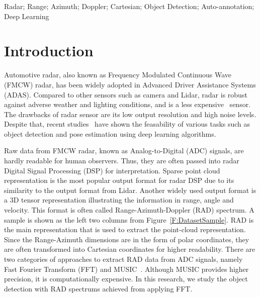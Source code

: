 \documentclass[10pt, conference, compsocconf]{IEEEtran}
\begin{document}
\begin{IEEEkeywords}

Radar; Range; Azimuth; Doppler; Cartesian; Object Detection; Auto-annotation; Deep Learning

\end{IEEEkeywords}


%
\IEEEpeerreviewmaketitle



\section{Introduction}

Automotive radar, also known as Frequency Modulated Continuous Wave (FMCW) radar, has been widely adopted in Advanced Driver Assistance Systems (ADAS). Compared to other sensors such as camera and Lidar, radar is robust against adverse weather and lighting conditions, and is a less expensive~\cite{Ref:HighResolutionRadarDataset} sensor. The drawbacks of radar sensor are its low output resolution and high noise levels. Despite that, recent studies~\cite{Ref:ProbabilisticOriented, Ref:DeepRadarDetector, Ref:DeepOpenSpace} have shown the feasability of various tasks such as object detection and pose estimation using deep learning algorithms.


Raw data from FMCW radar, known as Analog-to-Digital (ADC) signals, are hardly readable for human observers. Thus, they are often passed into radar Digital Signal Processing (DSP) for interpretation. Sparse point cloud representation is the most popular output format for radar DSP due to its similarity to the output format from Lidar. Another widely used output format is a 3D tensor representation illustrating the information in range, angle and velocity. This format is often called Range-Azimuth-Doppler (RAD) spectrum. A sample is shown as the left two columns from Figure~\ref{F:DatasetSample}. RAD is the main representation that is used to extract the point-cloud representation. Since the Range-Azimuth dimensions are in the form of polar coordinates, they are often transformed into Cartesian coordinates for higher readability. There are two categories of approaches to extract RAD data from ADC signals, namely Fast Fourier Transform (FFT) and MUSIC~\cite{BG:MUSIC}. Although MUSIC provides higher precision, it is computationally expensive. In this research, we study the object detection with RAD spectrums achieved from applying FFT.
\end{document}

